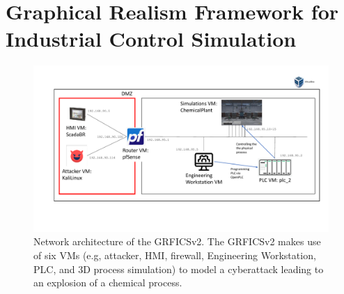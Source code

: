 %
%

\appendix
\appendixpage
\addappheadtotoc

\chapter{Graphical Realism Framework for Industrial Control Simulation}
\label{ch:GRFICS}

\begin{figure}[H]
    \centering
    \includegraphics[width=\linewidth, trim={1cm 3cm 1cm 1cm}, clip]{figures/GRFICSv2_net_arch.pdf}
    \caption{Network architecture of the GRFICSv2. The GRFICSv2 makes use of six VMs (e.g, attacker, HMI, firewall, Engineering Workstation, PLC, and 3D process simulation) to model a cyberattack leading to an explosion of a chemical process.}
    \label{fig:GRFICSv2_arch}
\end{figure}


